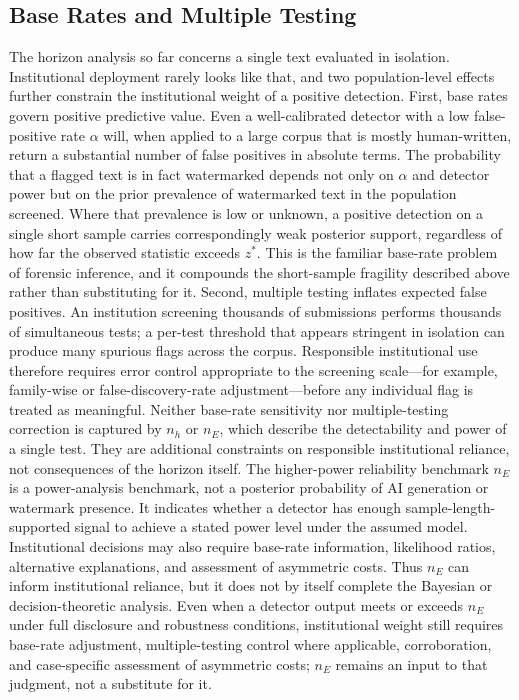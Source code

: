\documentclass[11pt]{article}
\begin{document}
\subsection{Base Rates and Multiple Testing}
The horizon analysis so far concerns a single text evaluated in isolation.
Institutional deployment rarely looks like that, and two population-level effects
further constrain the institutional weight of a positive detection.
First, base rates govern positive predictive value. Even a well-calibrated detector
with a low false-positive rate $\alpha$ will, when applied to a large corpus that is
mostly human-written, return a substantial number of false positives in absolute
terms. The probability that a flagged text is in fact watermarked depends not only on
$\alpha$ and detector power but on the prior prevalence of watermarked text in the
population screened. Where that prevalence is low or unknown, a positive detection on
a single short sample carries correspondingly weak posterior support, regardless of
how far the observed statistic exceeds $z^*$. This is the familiar base-rate problem
of forensic inference, and it compounds the short-sample fragility described above
rather than substituting for it.
Second, multiple testing inflates expected false positives. An institution screening
thousands of submissions performs thousands of simultaneous tests; a per-test
threshold that appears stringent in isolation can produce many spurious flags across
the corpus. Responsible institutional use therefore requires error control
appropriate to the screening scale---for example, family-wise or
false-discovery-rate adjustment---before any individual flag is treated as
meaningful. Neither base-rate sensitivity nor multiple-testing correction is captured
by $n_h$ or $n_E$, which describe the detectability and power of a single test. They
are additional constraints on responsible institutional reliance, not consequences of
the horizon itself.
The higher-power reliability benchmark $n_E$ is a power-analysis benchmark, not a
posterior probability of AI generation or watermark presence. It indicates whether a
detector has enough sample-length-supported signal to achieve a stated power level
under the assumed model. Institutional decisions may also require base-rate
information, likelihood ratios, alternative explanations, and assessment of
asymmetric costs. Thus $n_E$ can inform institutional reliance, but it does not by
itself complete the Bayesian or decision-theoretic analysis. Even when a detector
output meets or exceeds $n_E$ under full disclosure and robustness conditions,
institutional weight still requires base-rate adjustment, multiple-testing control
where applicable, corroboration, and case-specific assessment of asymmetric costs;
$n_E$ remains an input to that judgment, not a substitute for it.
\end{document}

